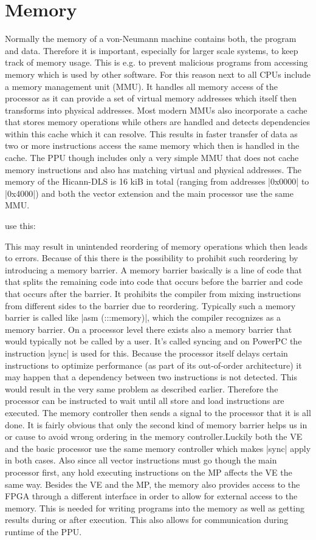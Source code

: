 \section{Memory}
Normally the memory of a von-Neumann machine contains both, the program and data.
Therefore it is important, especially for larger scale systems, to keep track of memory usage.
This is e.g. to prevent malicious programs from accessing memory which is used by other software.
For this reason next to all CPUs include a memory management unit (MMU).
It handles all memory access of the processor as it can provide a set of virtual memory addresses which itself then transforms into physical addresses.
Most modern MMUs also incorporate a cache that stores memory operations while others are handled and detects dependencies within this cache which it can resolve.
This results in faster transfer of data as two or more instructions access the same memory which then is handled in the cache.
The PPU though includes only a very simple MMU that does not cache memory instructions and also has matching virtual and physical addresses.
The memory of the Hicann-DLS is 16 kiB in total (ranging from addresses |0x0000| to |0x4000|) and both the vector extension and the main processor use the same MMU.

use this:

This may result in unintended reordering of memory operations which then leads to errors.
Because of this there is the possibility to prohibit such reordering by introducing a memory barrier.
A memory barrier basically is a line of code that that splits the remaining code into code that occurs before the barrier and code that occurs after the barrier.
It prohibits the compiler from mixing instructions from different sides to the barrier due to reordering.
Typically such a memory barrier is called like |asm (:::memory)|, which the compiler recognizes as a memory barrier.
On a processor level there exists also a memory barrier that would typically not be called by a user.
It's called syncing and on PowerPC the instruction |sync| is used for this.
Because the processor itself delays certain instructions to optimize performance (as part of its out-of-order architecture) it may happen that a dependency between two instructions is not detected.
This would result in the very same problem as described earlier.
Therefore the processor can be instructed to wait until all store and load instructions are executed.
The memory controller then sends a signal to the processor that it is all done.
It is fairly obvious that only the second kind of memory barrier helps us in or cause to avoid wrong ordering in the memory controller.Luckily both the VE and the basic processor use the same memory controller which makes |sync| apply in both cases.
Also since all vector instructions must go though the main processor first, any hold executing instructions on the MP affects the VE the same way.
Besides the VE and the MP, the memory also provides access to the FPGA through a different interface  in order to allow for external access to the memory.
This is needed for writing programs into the memory as well as getting results during or after execution.
This also allows for communication during runtime of the PPU.

